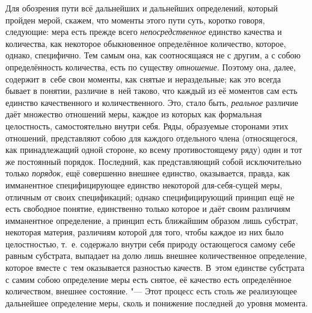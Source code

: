 Для обозрения пути всё дальнейших и дальнейших определений, который пройден
мерой, скажем, что моменты этого пути суть, коротко говоря, следующие: мера
есть прежде всего {\em непосредственное} единство качества и количества, как
некоторое обыкновенное определённое количество, которое, однако, специфично.
Тем самым она, как соотносящаяся не с другим, а с собою определённость
количества, есть по существу {\em отношение}. Поэтому она, далее, содержит
в~себе свои моменты, как снятые и нераздельные; как это всегда бывает
в понятии, различие в~ней таково, что каждый из её моментов сам есть единство
качественного и количественного. Это, стало быть, {\em реальное} различие даёт
множество отношений меры, каждое из которых как формальная целостность,
самостоятельно внутри себя. Ряды, образуемые сторонами этих отношений,
представляют собою для каждого отдельного члена (относящегося, как
принадлежащий одной стороне, ко всему противостоящему ряду) один и тот же
постоянный порядок. Последний, как представляющий собой исключительно только
{\em порядок,} ещё совершенно внешнее единство, оказывается, правда, как
имманентное специфицирующее единство некоторой для-себя-сущей меры, отличным
от своих спецификаций; однако специфицирующий принцип ещё не есть свободное
понятие, единственно только которое и даёт своим различиям имманентное
определение, а принцип есть ближайшим образом лишь субстрат, некоторая материя,
различиям которой для того, чтобы каждое из них было целостностью, т.~е.
содержало внутри себя природу остающегося самому себе равным субстрата,
выпадает на долю лишь внешнее количественное определение, которое вместе
с~тем оказывается разностью качеств. В~этом единстве субстрата с самим собою
определение меры есть снятое, её качество есть определённое количеством,
внешнее состояние. "--- Этот процесс есть столь же реализующее дальнейшее
определение меры, сколь и понижение последней до уровня момента.
